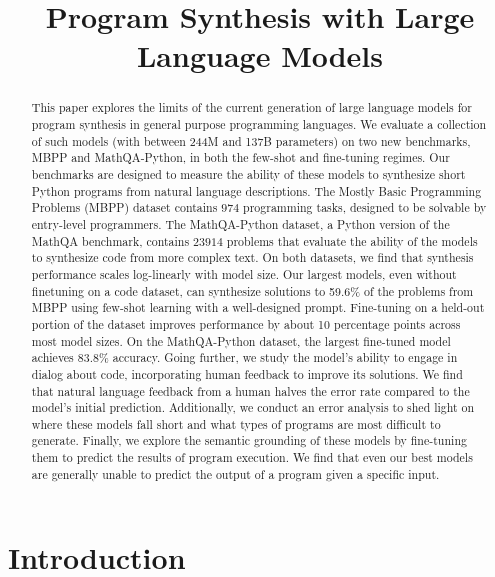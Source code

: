 \title{Program Synthesis with Large Language Models}

\begin{abstract}
This paper explores the limits of the current generation of large language models for program synthesis in general purpose programming languages. We evaluate a collection of such models (with between 244M and 137B parameters) on two new benchmarks, MBPP and MathQA-Python, in both the few-shot and fine-tuning regimes. Our benchmarks are designed to measure the ability of these models to synthesize short Python programs from natural language descriptions. The Mostly Basic Programming Problems (MBPP) dataset contains $974$ programming tasks, designed to be solvable by entry-level programmers. The MathQA-Python dataset, a Python version of the MathQA benchmark, contains $23914$ problems that evaluate the ability of the models to synthesize code from more complex text. On both datasets, we find that synthesis performance scales log-linearly with model size. Our largest models, even without finetuning on a code dataset,  can synthesize solutions to 59.6\% of the problems from MBPP using few-shot learning with a well-designed prompt. Fine-tuning on a held-out portion of the dataset improves performance by about 10 percentage points across most model sizes. On the MathQA-Python dataset, the largest fine-tuned model achieves 83.8\% accuracy. Going further, we study the model's ability to engage in dialog about code, incorporating human feedback to improve its solutions. We find that natural language feedback from a human halves the error rate compared to the model's initial prediction. Additionally, we conduct an error analysis to shed light on where these models fall short and what types of programs are most difficult to generate. Finally, we explore the semantic grounding of these models by fine-tuning them to predict the results of program execution. We find that even our best models are generally unable to predict the output of a program given a specific input.
\end{abstract}

\section{Introduction}

